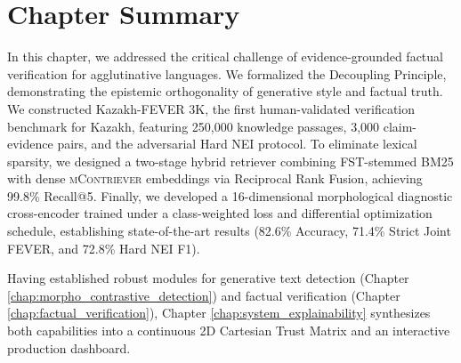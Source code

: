 \section{Chapter Summary}
\label{sec:ch5_summary}

In this chapter, we addressed the critical challenge of evidence-grounded factual verification for agglutinative languages. We formalized the Decoupling Principle, demonstrating the epistemic orthogonality of generative style and factual truth. We constructed Kazakh-FEVER 3K, the first human-validated verification benchmark for Kazakh, featuring 250,000 knowledge passages, 3,000 claim-evidence pairs, and the adversarial Hard NEI protocol. To eliminate lexical sparsity, we designed a two-stage hybrid retriever combining FST-stemmed BM25 with dense \textsc{mContriever} embeddings via Reciprocal Rank Fusion, achieving 99.8\% Recall@5. Finally, we developed a 16-dimensional morphological diagnostic cross-encoder trained under a class-weighted loss and differential optimization schedule, establishing state-of-the-art results (82.6\% Accuracy, 71.4\% Strict Joint FEVER, and 72.8\% Hard NEI F1).

Having established robust modules for generative text detection (Chapter \ref{chap:morpho_contrastive_detection}) and factual verification (Chapter \ref{chap:factual_verification}), Chapter \ref{chap:system_explainability} synthesizes both capabilities into a continuous 2D Cartesian Trust Matrix and an interactive production dashboard.
